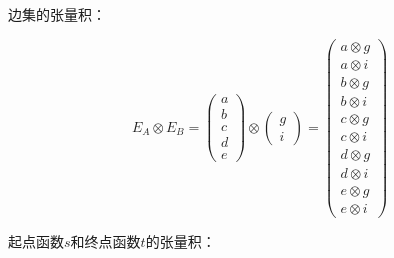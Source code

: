 \documentclass[10pt, openany]{book}
\begin{document}
边集的张量积：

\begin{equation}
E_A \otimes E_B
= \begin{pmatrix}
a \\ b \\ c \\ d \\ e
\end{pmatrix}
\otimes
\begin{pmatrix}
g \\ i
\end{pmatrix}
=\begin{pmatrix}
a \otimes g \\
a \otimes i \\
b \otimes g \\
b \otimes i \\
c \otimes g \\
c \otimes i \\
d \otimes g \\
d \otimes i \\
e \otimes g \\
e \otimes i
\end{pmatrix}
\end{equation}
\label{eq:edge-set-tensor}

起点函数$s$和终点函数$t$的张量积：
\end{document}
